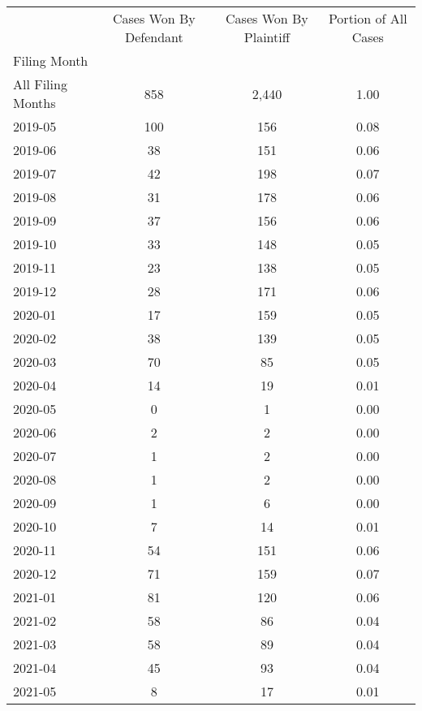 \begin{tabular}{lccc}
\toprule
 & Cases Won By Defendant & Cases Won By Plaintiff & Portion of All Cases \\
Filing Month &  &  &  \\
\midrule
All Filing Months & 858 & 2,440 & 1.00 \\
2019-05 & 100 & 156 & 0.08 \\
2019-06 & 38 & 151 & 0.06 \\
2019-07 & 42 & 198 & 0.07 \\
2019-08 & 31 & 178 & 0.06 \\
2019-09 & 37 & 156 & 0.06 \\
2019-10 & 33 & 148 & 0.05 \\
2019-11 & 23 & 138 & 0.05 \\
2019-12 & 28 & 171 & 0.06 \\
2020-01 & 17 & 159 & 0.05 \\
2020-02 & 38 & 139 & 0.05 \\
2020-03 & 70 & 85 & 0.05 \\
2020-04 & 14 & 19 & 0.01 \\
2020-05 & 0 & 1 & 0.00 \\
2020-06 & 2 & 2 & 0.00 \\
2020-07 & 1 & 2 & 0.00 \\
2020-08 & 1 & 2 & 0.00 \\
2020-09 & 1 & 6 & 0.00 \\
2020-10 & 7 & 14 & 0.01 \\
2020-11 & 54 & 151 & 0.06 \\
2020-12 & 71 & 159 & 0.07 \\
2021-01 & 81 & 120 & 0.06 \\
2021-02 & 58 & 86 & 0.04 \\
2021-03 & 58 & 89 & 0.04 \\
2021-04 & 45 & 93 & 0.04 \\
2021-05 & 8 & 17 & 0.01 \\
\bottomrule
\end{tabular}
